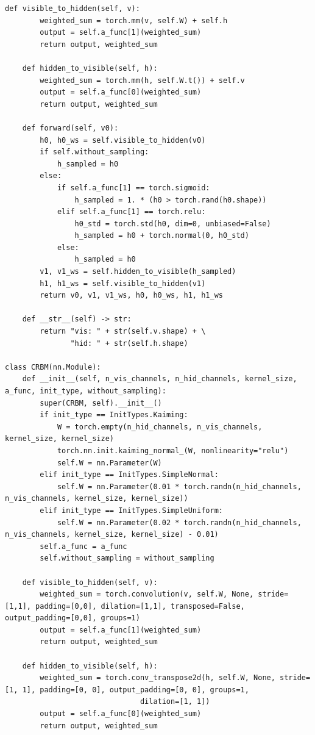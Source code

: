 \begin{lstlisting}[style=PythonStyle]
    def visible_to_hidden(self, v):
        weighted_sum = torch.mm(v, self.W) + self.h
        output = self.a_func[1](weighted_sum)
        return output, weighted_sum

    def hidden_to_visible(self, h):
        weighted_sum = torch.mm(h, self.W.t()) + self.v
        output = self.a_func[0](weighted_sum)
        return output, weighted_sum

    def forward(self, v0):
        h0, h0_ws = self.visible_to_hidden(v0)
        if self.without_sampling:
            h_sampled = h0
        else:
            if self.a_func[1] == torch.sigmoid:
                h_sampled = 1. * (h0 > torch.rand(h0.shape))
            elif self.a_func[1] == torch.relu:
                h0_std = torch.std(h0, dim=0, unbiased=False)
                h_sampled = h0 + torch.normal(0, h0_std)
            else:
                h_sampled = h0
        v1, v1_ws = self.hidden_to_visible(h_sampled)
        h1, h1_ws = self.visible_to_hidden(v1)
        return v0, v1, v1_ws, h0, h0_ws, h1, h1_ws

    def __str__(self) -> str:
        return "vis: " + str(self.v.shape) + \
               "hid: " + str(self.h.shape)
               
class CRBM(nn.Module):
    def __init__(self, n_vis_channels, n_hid_channels, kernel_size, a_func, init_type, without_sampling):
        super(CRBM, self).__init__()
        if init_type == InitTypes.Kaiming:
            W = torch.empty(n_hid_channels, n_vis_channels, kernel_size, kernel_size)
            torch.nn.init.kaiming_normal_(W, nonlinearity="relu")
            self.W = nn.Parameter(W)
        elif init_type == InitTypes.SimpleNormal:
            self.W = nn.Parameter(0.01 * torch.randn(n_hid_channels, n_vis_channels, kernel_size, kernel_size))
        elif init_type == InitTypes.SimpleUniform:
            self.W = nn.Parameter(0.02 * torch.randn(n_hid_channels, n_vis_channels, kernel_size, kernel_size) - 0.01)
        self.a_func = a_func
        self.without_sampling = without_sampling

    def visible_to_hidden(self, v):
        weighted_sum = torch.convolution(v, self.W, None, stride=[1,1], padding=[0,0], dilation=[1,1], transposed=False, output_padding=[0,0], groups=1)
        output = self.a_func[1](weighted_sum)
        return output, weighted_sum

    def hidden_to_visible(self, h):
        weighted_sum = torch.conv_transpose2d(h, self.W, None, stride=[1, 1], padding=[0, 0], output_padding=[0, 0], groups=1,
                               dilation=[1, 1])
        output = self.a_func[0](weighted_sum)
        return output, weighted_sum


\end{lstlisting}
